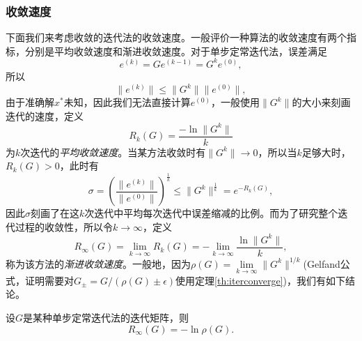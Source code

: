 \documentclass[a4paper,10pt]{ctexart}
\begin{document}
\subsubsection{收敛速度}
下面我们来考虑收敛的迭代法的收敛速度。一般评价一种算法的收敛速度有两个指标，分别是平均收敛速度和渐进收敛速度。对于单步定常迭代法，误差满足
\[
    e^{(k)} = G e^{(k-1)} = G^k e^{(0)},
\]
所以
\[
    \| e^{(k)} \| \leqslant \| G^k \| \| e^{(0)} \|,
\]
由于准确解$ x^* $未知，因此我们无法直接计算$ e^{(0)} $，一般使用$ \| G^k \| $的大小来刻画迭代的速度，定义
\begin{equation}
    R_k(G) = \frac{-\ln \| G^k \|}{k}
\end{equation}
为$ k $次迭代的\emph{平均收敛速度}。当某方法收敛时有$ \| G^k \| \to 0 $，所以当$ k $足够大时，$ R_k(G)>0 $，此时有
\[
    \sigma = \left( \frac{\| e^{(k)} \|}{\| e^{(0)} \| } \right)^{\frac{1}{k}} \leqslant \| G^k \|^{\frac{1}{k}} = e^{-R_k(G)},
\]
因此$ \sigma $刻画了在这$ k $次迭代中平均每次迭代中误差缩减的比例。而为了研究整个迭代过程的收敛性，所以令$ k\to \infty $，定义
\begin{equation}
    R_\infty(G) = \lim_{k\to \infty} R_k(G) = -\lim_{k\to \infty} \frac{\ln \| G^k \|}{k},
\end{equation}
称为该方法的\emph{渐进收敛速度}。一般地，因为$ \rho(G) = \lim\limits_{k\to\infty}\| G^k \|^{1/k} $(Gelfand公式，证明需要对$ G_\pm = G / (\rho(G)\pm \epsilon) $使用定理\ref{th:iterconverge})，我们有如下结论。
\begin{theorem}
    设$ G $是某种单步定常迭代法的迭代矩阵，则
    \[
        R_\infty(G) = -\ln \rho(G).
    \]
\end{theorem}
\end{document}
